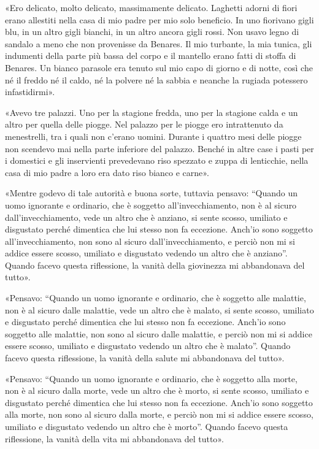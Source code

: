  «Ero delicato, molto delicato, massimamente
delicato.
Laghetti adorni di fiori erano allestiti nella casa di mio padre per mio solo
beneficio. In uno fiorivano gigli blu, in un altro gigli bianchi, in un altro
ancora gigli rossi. Non usavo legno di sandalo a meno che non provenisse da
Benares. Il mio turbante, la mia tunica, gli indumenti della parte più bassa del
corpo e il mantello erano fatti di stoffa di Benares. Un bianco parasole era
tenuto sul mio capo di giorno e di notte, così che né il freddo né il caldo, né
la polvere né la sabbia e neanche la rugiada potessero infastidirmi».

«Avevo tre palazzi. Uno per la stagione fredda, uno per la stagione calda e un
altro per quella delle piogge. Nel palazzo per le piogge ero intrattenuto da
menestrelli, tra i quali non c’erano uomini. Durante i quattro mesi delle piogge
non scendevo mai nella parte inferiore del palazzo. Benché in altre case i pasti
per i domestici e gli inservienti prevedevano riso spezzato e zuppa di
lenticchie, nella casa di mio padre a loro era dato riso bianco e carne».

«Mentre godevo di tale autorità e buona sorte, tuttavia pensavo: “Quando un uomo
ignorante e ordinario, che è soggetto all’invecchiamento, non è al sicuro
dall’invecchiamento, vede un altro che è anziano, si sente scosso, umiliato e
disgustato perché dimentica che lui stesso non fa eccezione. Anch’io sono
soggetto all’invecchiamento, non sono al sicuro dall’invecchiamento, e perciò
non mi si addice essere scosso, umiliato e disgustato vedendo un altro che è
anziano”. Quando facevo questa riflessione, la vanità della giovinezza mi
abbandonava del tutto».

«Pensavo: “Quando un uomo ignorante e ordinario, che è soggetto alle malattie,
non è al sicuro dalle malattie, vede un altro che è malato, si sente scosso,
umiliato e disgustato perché dimentica che lui stesso non fa eccezione. Anch’io
sono soggetto alle malattie, non sono al sicuro dalle malattie, e perciò non mi
si addice essere scosso, umiliato e disgustato vedendo un altro che è malato”.
Quando facevo questa riflessione, la vanità della salute mi abbandonava del
tutto».

«Pensavo: “Quando un uomo ignorante e ordinario, che è soggetto alla morte, non
è al sicuro dalla morte, vede un altro che è morto, si sente scosso, umiliato e
disgustato perché dimentica che lui stesso non fa eccezione. Anch’io sono
soggetto alla morte, non sono al sicuro dalla morte, e perciò non mi si addice
essere scosso, umiliato e disgustato vedendo un altro che è morto”. Quando
facevo questa riflessione, la vanità della vita mi abbandonava del tutto».


